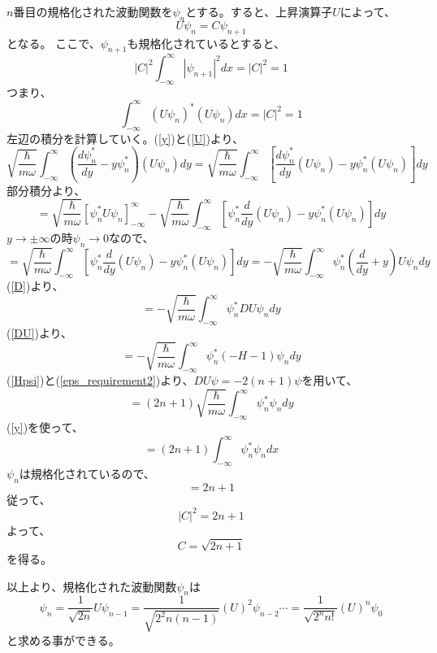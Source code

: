 $n$番目の規格化された波動関数を$\psi_n$とする。すると、上昇演算子$U$によって、
\begin{equation}
	U\psi_n = C\psi_{n+1}
\end{equation}
となる。
ここで、$\psi_{n+1}$も規格化されているとすると、
\begin{equation}
	|C|^2 \int_{-\infty}^\infty |\psi_{n+1}|^2 dx = |C|^2 = 1
\end{equation}
つまり、
\begin{equation}
	\int_{-\infty}^\infty (U\psi_n)^*(U\psi_n)dx = |C|^2 = 1
\end{equation}
左辺の積分を計算していく。(\ref{y})と(\ref{U})より、
\begin{equation}
	\sqrt{\dfrac{\hbar}{m\omega}}\int_{-\infty}^\infty (\dfrac{d\psi_n^*}{dy} -y\psi_n^*)(U\psi_n)dy
	= \sqrt{\dfrac{\hbar}{m\omega}}\int_{-\infty}^\infty \left[ \dfrac{d\psi_n^*}{dy}(U\psi_n) -y\psi_n^*(U\psi_n) \right]dy
\end{equation}
部分積分より、
\begin{equation}
	= \sqrt{\dfrac{\hbar}{m\omega}}[\psi_n^* U \psi_n ]_{-\infty}^\infty
		- \sqrt{\dfrac{\hbar}{m\omega}}\int_{-\infty}^\infty \left[ \psi_n^*\dfrac{d}{dy}(U\psi_n) -y\psi_n^*(U\psi_n)\right]dy
\end{equation}
$y \to \pm\infty$の時$\psi_n \to 0$なので、
\begin{equation}
	= \sqrt{\dfrac{\hbar}{m\omega}}\int_{-\infty}^\infty \left[ \psi_n^*\dfrac{d}{dy}(U\psi_n) -y\psi_n^*(U\psi_n)\right]dy
	=  -\sqrt{\dfrac{\hbar}{m\omega}}\int_{-\infty}^\infty \psi_n^* \left(\dfrac{d}{dy} + y\right)U\psi_n dy
\end{equation}
(\ref{D})より、
\begin{equation}
	= -\sqrt{\dfrac{\hbar}{m\omega}}\int_{-\infty}^\infty \psi_n^* DU\psi_n dy
\end{equation}
(\ref{DU})より、
\begin{equation}
	= -\sqrt{\dfrac{\hbar}{m\omega}}\int_{-\infty}^\infty \psi_n^* (-H-1)\psi_n dy
\end{equation}
(\ref{Hpsi})と(\ref{eps_requirement2})より、$DU\psi = -2(n+1)\psi$を用いて、
\begin{equation}
	= (2n+1)\sqrt{\dfrac{\hbar}{m\omega}}\int_{-\infty}^\infty \psi_n^*\psi_n dy
\end{equation}
(\ref{y})を使って、
\begin{equation}
	= (2n+1)\int_{-\infty}^\infty \psi_n^*\psi_n dx
\end{equation}
$\psi_n$は規格化されているので、
\begin{equation}
	= 2n+1
\end{equation}
従って、
\begin{equation}
	|C|^2 = 2n+1
\end{equation}
よって、
\begin{equation}
	C = \sqrt{2n+1}
\end{equation}
を得る。

以上より、規格化された波動関数$\psi_n$は
\begin{equation}
\psi_{n}=\frac{1}{\sqrt{2 n}} U \psi_{n-1}=\frac{1}{\sqrt{2^{2} n(n-1)}}(U)^{2} \psi_{n-2} \cdots=\frac{1}{\sqrt{2^{n} n !}}(U)^{n} \psi_{0}
\end{equation}
と求める事ができる。

